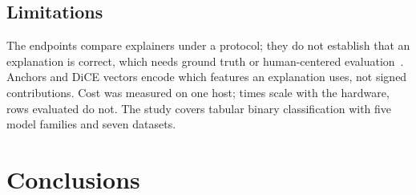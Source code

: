 \documentclass[11pt,a4paper]{article}
\begin{document}
\subsection{Limitations}
\label{sec:validity}

The endpoints compare explainers under a protocol; they do not establish
that an explanation is correct, which needs ground truth or
human-centered evaluation~\cite{haufe2026formalization}.
Anchors and DiCE vectors encode which features an explanation uses, not
signed contributions. Cost was measured on one host; times scale with the
hardware, rows evaluated do not. The study covers tabular binary
classification with five model families and seven datasets.

\section{Conclusions}
\label{sec:conclusion}
\end{document}
